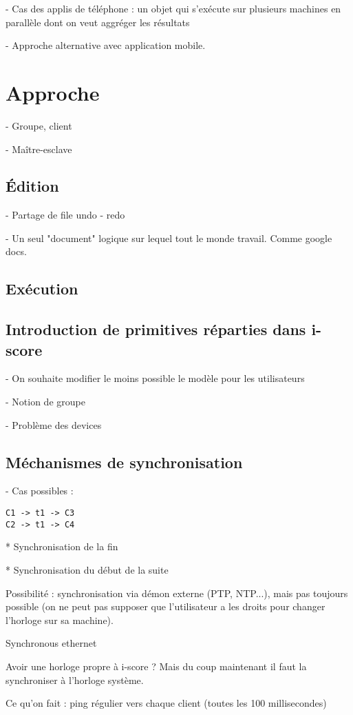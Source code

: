 \documentclass{article}
\begin{document}
- Cas des applis de téléphone : un objet qui s'exécute sur plusieurs machines en parallèle dont on veut aggréger les résultats

- Approche alternative avec application mobile.

\section{Approche}
- Groupe, client

- Maître-esclave
\subsection{Édition}
- Partage de file undo - redo

- Un seul "document" logique sur lequel tout le monde travail. Comme google docs.

\subsection{Exécution}

\subsection{Introduction de primitives réparties dans i-score}
- On souhaite modifier le moins possible le modèle pour les utilisateurs

- Notion de groupe

- Problème des devices

\subsection{Méchanismes de synchronisation}
- Cas possibles : 
\begin{lstlisting}
C1 -> t1 -> C3
C2 -> t1 -> C4
\end{lstlisting}

* Synchronisation de la fin

* Synchronisation du début de la suite

Possibilité : synchronisation via démon externe (PTP, NTP...), mais pas toujours possible (on ne peut pas supposer que l'utilisateur a les droits pour changer l'horloge sur sa machine).

Synchronous ethernet

Avoir une horloge propre à i-score ? Mais du coup maintenant il faut la synchroniser à l'horloge système. 

Ce qu'on fait : ping régulier vers chaque client (toutes les 100 millisecondes)
\end{document}

